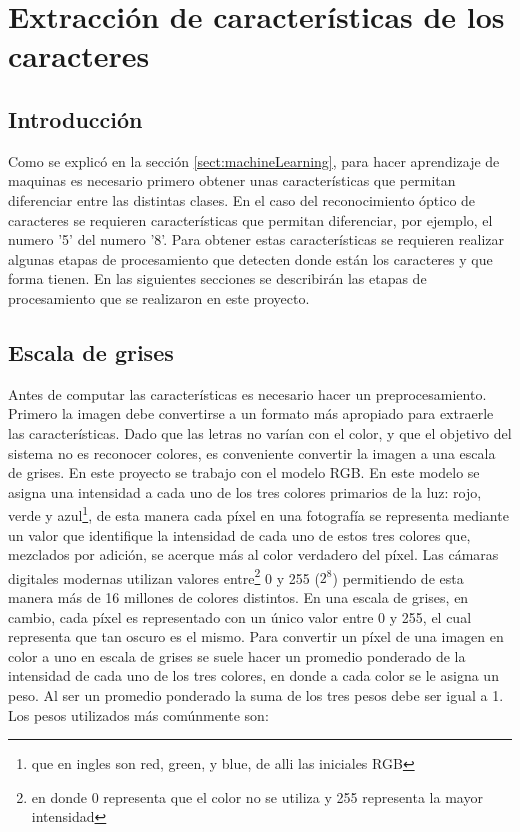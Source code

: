 \documentclass[a4paper, 11pt, oneside]{report}
\begin{document}
\chapter{Extracción de características de los caracteres}
\label{chap:features}

\section{Introducción}

Como se explicó en la sección \ref{sect:machineLearning}, para hacer aprendizaje de maquinas es necesario primero obtener unas características que permitan diferenciar entre las distintas clases. En el caso del reconocimiento óptico de caracteres se requieren características que permitan diferenciar, por ejemplo, el numero '5' del numero '8'. Para obtener estas características se requieren realizar algunas etapas de procesamiento que detecten donde están los caracteres y que forma tienen. En las siguientes secciones se describirán las etapas de procesamiento que se realizaron en este proyecto.

\section{Escala de grises}

Antes de computar las características es necesario hacer un preprocesamiento. Primero la imagen debe convertirse a un formato más apropiado para extraerle las características. Dado que las letras no varían con el color, y que el objetivo del sistema no es reconocer colores, es conveniente convertir la imagen a una escala de grises. En este proyecto se trabajo con el modelo RGB. En este modelo se asigna una intensidad a cada uno de los tres colores primarios de la luz: rojo, verde y azul\footnote{que en ingles son red, green, y blue, de alli las iniciales RGB}, de esta manera cada píxel en una fotografía se representa mediante un valor que identifique la intensidad de cada uno de estos tres colores que, mezclados por adición, se acerque más al color verdadero del píxel. Las cámaras digitales modernas utilizan valores entre\footnote{en donde 0 representa que el color no se utiliza y 255 representa la mayor intensidad} 0 y 255 ($2^8$) permitiendo de esta manera más de 16 millones de colores distintos. En una escala de grises, en cambio, cada píxel es representado con un único valor entre 0 y 255, el cual representa que tan oscuro es el mismo. Para convertir un píxel de una imagen en color a uno en escala de grises se suele hacer un promedio ponderado de la intensidad de cada uno de los tres colores, en donde a cada color se le asigna un peso. Al ser un promedio ponderado la suma de los tres pesos debe ser igual a 1. Los pesos utilizados más comúnmente son:
\end{document}
